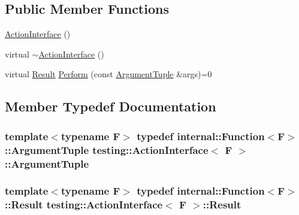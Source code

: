 \subsection*{Public Member Functions}
\begin{DoxyCompactItemize}
\item 
\hyperlink{classtesting_1_1ActionInterface_a0f1d44e4c669a9cae5ee5b28419a6f52}{Action\+Interface} ()
\item 
virtual \hyperlink{classtesting_1_1ActionInterface_a7dd0a5fc93d86ae3c9d04963b9f3a93f}{$\sim$\+Action\+Interface} ()
\item 
virtual \hyperlink{classtesting_1_1ActionInterface_a7477de2fe3e4e01c59db698203acaee7}{Result} \hyperlink{classtesting_1_1ActionInterface_a20f8624fcea1786f2992b358760422a0}{Perform} (const \hyperlink{classtesting_1_1ActionInterface_af72720d864da4d606629e83edc003511}{Argument\+Tuple} \&args)=0
\end{DoxyCompactItemize}


\subsection{Member Typedef Documentation}
\subsubsection[{\texorpdfstring{Argument\+Tuple}{ArgumentTuple}}]{\setlength{\rightskip}{0pt plus 5cm}template$<$typename F$>$ typedef {\bf internal\+::\+Function}$<$F$>$\+::{\bf Argument\+Tuple} {\bf testing\+::\+Action\+Interface}$<$ F $>$\+::{\bf Argument\+Tuple}}\hypertarget{classtesting_1_1ActionInterface_af72720d864da4d606629e83edc003511}{}\label{classtesting_1_1ActionInterface_af72720d864da4d606629e83edc003511}
\subsubsection[{\texorpdfstring{Result}{Result}}]{\setlength{\rightskip}{0pt plus 5cm}template$<$typename F$>$ typedef {\bf internal\+::\+Function}$<$F$>$\+::{\bf Result} {\bf testing\+::\+Action\+Interface}$<$ F $>$\+::{\bf Result}}\hypertarget{classtesting_1_1ActionInterface_a7477de2fe3e4e01c59db698203acaee7}{}\label{classtesting_1_1ActionInterface_a7477de2fe3e4e01c59db698203acaee7}


